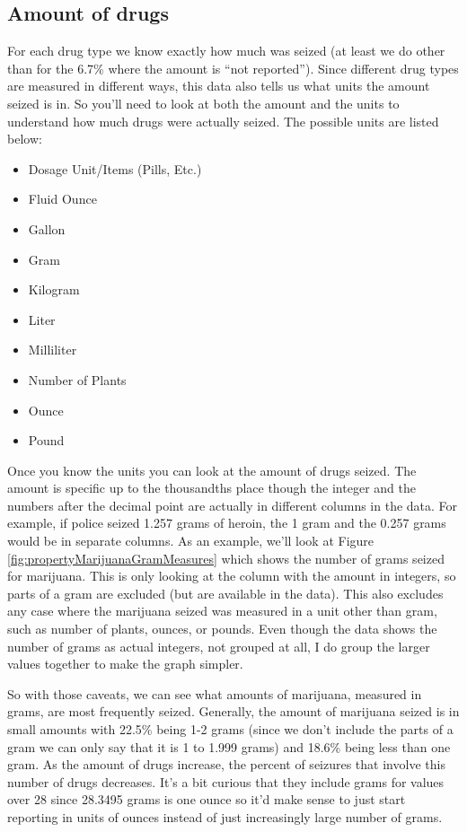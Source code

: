\documentclass[
  12pt,
  openany]{book}
\providecommand{\tightlist}{%
  \setlength{\itemsep}{0pt}\setlength{\parskip}{0pt}}
\begin{document}
\subsection{Amount of drugs}\label{amount-of-drugs}

For each drug type we know exactly how much was seized (at least we do other than for the 6.7\% where the amount is ``not reported''). Since different drug types are measured in different ways, this data also tells us what units the amount seized is in. So you'll need to look at both the amount and the units to understand how much drugs were actually seized. The possible units are listed below:

\begin{itemize}
\tightlist
\item
  Dosage Unit/Items (Pills, Etc.)
\item
  Fluid Ounce
\item
  Gallon\\
\item
  Gram
\item
  Kilogram\\
\item
  Liter\\
\item
  Milliliter
\item
  Number of Plants\\
\item
  Ounce
\item
  Pound
\end{itemize}

Once you know the units you can look at the amount of drugs seized. The amount is specific up to the thousandths place though the integer and the numbers after the decimal point are actually in different columns in the data. For example, if police seized 1.257 grams of heroin, the 1 gram and the 0.257 grams would be in separate columns. As an example, we'll look at Figure \ref{fig:propertyMarijuanaGramMeasures} which shows the number of grams seized for marijuana. This is only looking at the column with the amount in integers, so parts of a gram are excluded (but are available in the data). This also excludes any case where the marijuana seized was measured in a unit other than gram, such as number of plants, ounces, or pounds. Even though the data shows the number of grams as actual integers, not grouped at all, I do group the larger values together to make the graph simpler.

So with those caveats, we can see what amounts of marijuana, measured in grams, are most frequently seized. Generally, the amount of marijuana seized is in small amounts with 22.5\% being 1-2 grams (since we don't include the parts of a gram we can only say that it is 1 to 1.999 grams) and 18.6\% being less than one gram. As the amount of drugs increase, the percent of seizures that involve this number of drugs decreases. It's a bit curious that they include grams for values over 28 since 28.3495 grams is one ounce so it'd make sense to just start reporting in units of ounces instead of just increasingly large number of grams.
\end{document}
